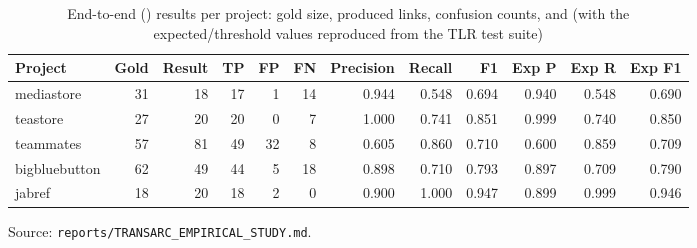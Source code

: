 \begin{table}[htbp]
  \centering
  \caption{End-to-end \sadcode (\transarc) results per project: gold size, produced links, confusion counts, and \fone (with the expected/threshold values reproduced from the TLR test suite)}
  \label{tab:transarc-overview}
  \begin{tabular}{lrrrrrrrrrrr}
    \toprule
    Project & Gold & Result & TP & FP & FN & Precision & Recall & F1 & Exp P & Exp R & Exp F1 \\
    \midrule
    mediastore & 31 & 18 & 17 & 1 & 14 & 0.944 & 0.548 & 0.694 & 0.940 & 0.548 & 0.690 \\
    teastore & 27 & 20 & 20 & 0 & 7 & 1.000 & 0.741 & 0.851 & 0.999 & 0.740 & 0.850 \\
    teammates & 57 & 81 & 49 & 32 & 8 & 0.605 & 0.860 & 0.710 & 0.600 & 0.859 & 0.709 \\
    bigbluebutton & 62 & 49 & 44 & 5 & 18 & 0.898 & 0.710 & 0.793 & 0.897 & 0.709 & 0.790 \\
    jabref & 18 & 20 & 18 & 2 & 0 & 0.900 & 1.000 & 0.947 & 0.899 & 0.999 & 0.946 \\
    \bottomrule
  \end{tabular}
  \par\smallskip\footnotesize Source: \texttt{reports/TRANSARC\_EMPIRICAL\_STUDY.md}.
\end{table}
